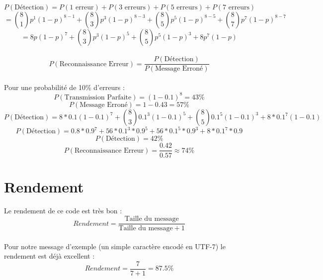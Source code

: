         \paragraph{}
\[  P(\text{Détection}) = P(\text{1 erreur}) + P(\text{3 erreurs}) + P(\text{5 erreurs}) + P(\text{7 erreurs}) \]
\[ = {8\choose 1}p^1(1-p)^{8-1} + {8\choose 3}p^3(1-p)^{8-3} + {8\choose 5}p^5(1-p)^{8-5} + {8\choose 7}p^7(1-p)^{8-7} \]
\[ = 8p(1-p)^7 + {8\choose 3}p^3(1-p)^5 + {8\choose 5}p^5(1-p)^3 + 8p^7(1-p) \]
        \paragraph{}
\[  P(\text{Reconnaissance Erreur}) = \frac{P(\text{Détection})}{P(\text{Message Erroné})}\]
        \paragraph{}
Pour une probabilité de 10\% d'erreurs :
\[  P(\text{Transmission Parfaite}) = (1-0.1)^{8} = 43\%\]
\[  P(\text{Message Erroné}) = 1 - 0.43 = 57\% \]
\[  P(\text{Détection}) = 8*0.1(1-0.1)^7 + {8\choose 3}0.1^3(1-0.1)^5 + {8\choose 5}0.1^5(1-0.1)^3 + 8*0.1^7(1-0.1) \]
\[  P(\text{Détection}) = 0.8*0.9^7 + 56*0.1^3*0.9^5 + 56*0.1^5*0.9^3 + 8*0.1^7*0.9 \]
\[  P(\text{Détection}) = 42\% \]
\[  P(\text{Reconnaissance Erreur}) = \frac{0.42}{0.57} \approx 74\% \]


    \section{Rendement}

        \paragraph{}
Le rendement de ce code est très bon :
\[  Rendement = \frac{\text{Taille du message}}{\text{Taille du message}+1} \]
        \paragraph{}
Pour notre message d'exemple (un simple caractère encodé en UTF-7) le rendement est déjà excellent :
\[  Rendement = \frac{7}{7+1} = 87.5\% \]
